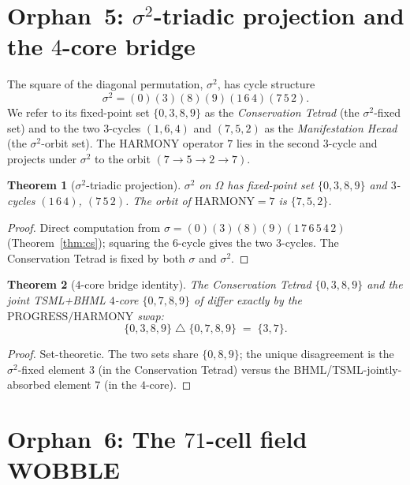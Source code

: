 \documentclass[11pt,reqno]{amsart}
\theoremstyle{plain}
\newtheorem{theorem}{Theorem}[section]
\theoremstyle{definition}
\theoremstyle{remark}
\begin{document}
\section{Orphan~5: $\sigma^2$-triadic projection and the $4$-core bridge}
\label{sec:triadic}

The square of the diagonal permutation, $\sigma^2$, has cycle
structure
\[
\sigma^2 = (0)(3)(8)(9)(1\,6\,4)(7\,5\,2).
\]
We refer to its fixed-point set $\{0,3,8,9\}$ as the
\emph{Conservation Tetrad} (the $\sigma^2$-fixed set) and to the two
$3$-cycles $(1,6,4)$ and $(7,5,2)$ as the \emph{Manifestation Hexad}
(the $\sigma^2$-orbit set). The HARMONY operator $7$ lies in the
second $3$-cycle and projects under $\sigma^2$ to the orbit
$(7\to 5\to 2\to 7)$.

\begin{theorem}[$\sigma^2$-triadic projection]\label{thm:triadic}
$\sigma^2$ on $\Omega$ has fixed-point set $\{0,3,8,9\}$ and $3$-cycles
$(1\,6\,4)$, $(7\,5\,2)$. The orbit of $\mathrm{HARMONY}=7$ is
$\{7,5,2\}$.
\end{theorem}

\begin{proof}
Direct computation from $\sigma=(0)(3)(8)(9)(1\,7\,6\,5\,4\,2)$
(Theorem~\ref{thm:cs}); squaring the $6$-cycle gives the two
$3$-cycles. The Conservation Tetrad is fixed by both $\sigma$ and
$\sigma^2$.
\end{proof}

\begin{theorem}[$4$-core bridge identity]\label{thm:bridge}
The Conservation Tetrad $\{0,3,8,9\}$ and the joint TSML+BHML $4$-core
$\{0,7,8,9\}$ of \cite{SandersGishFourCore} differ exactly by the
$\mathrm{PROGRESS}/\mathrm{HARMONY}$ swap:
\[
\{0,3,8,9\} \;\triangle\; \{0,7,8,9\} \;=\; \{3,7\}.
\]
\end{theorem}

\begin{proof}
Set-theoretic. The two sets share $\{0,8,9\}$; the unique
disagreement is the $\sigma^2$-fixed element $3$ (in the
Conservation Tetrad) versus the BHML/TSML-jointly-absorbed element
$7$ (in the $4$-core).
\end{proof}

\section{Orphan~6: The $71$-cell field WOBBLE}
\label{sec:wobble}
\end{document}
